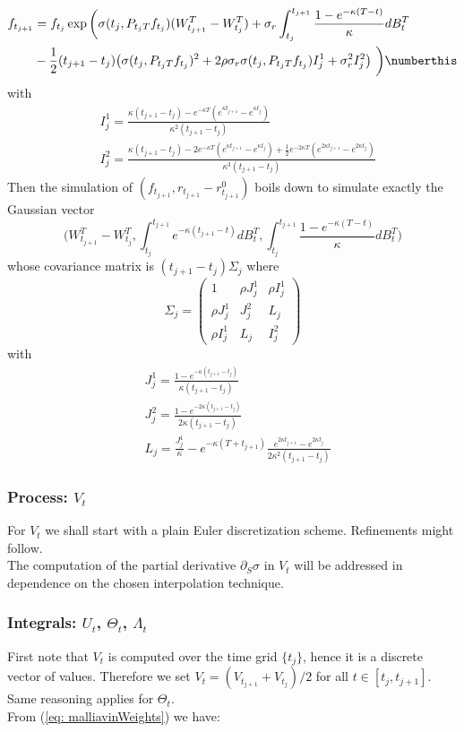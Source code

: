 \begin{align*}
f_{t_{j+1}}& = f_{t_{j}} \exp\bigg(  \sigma(t_j,P_{t_j T}f_{t_j})(W_{t_{j+1}}^T-W^T_{t_{j}})+\sigma_r\int_{t_j}^{t_{j+1}} \frac{1-e^{-\kappa(T-t)}}{\kappa}dB_t^T \\
& -\frac{1}{2}(t_{j+1}-t_{j})\big(\sigma(t_j,P_{t_j T}f_{t_j})^2+2\rho\sigma_r\sigma(t_j,P_{t_j T}f_{t_j})I^1_j + \sigma_r^2I_j^2\big)  \    \bigg) \numberthis \label{eq: discretization_forwardPrice}
\end{align*}
with 
\begin{align*}
& I^1_j = \frac{\kappa(t_{j+1}-t_{j})-e^{-\kappa T }(e^{\kappa t_{j+1} }-e^{\kappa t_{j} }) }{\kappa^2 (t_{j+1}-t_{j})} \\
& I^2_j = \frac{\kappa(t_{j+1}-t_{j})  -2e^{-\kappa T }(e^{\kappa t_{j+1} }-e^{\kappa t_{j} }) +\frac{1}{2}e^{-2\kappa T }(e^{2\kappa t_{j+1} }-e^{2\kappa t_{j} }) }{\kappa^3(t_{j+1}-t_{j})}
\end{align*}
Then the simulation of $(f_{t_{j+1}}, r_{t_{j+1}} - r^0_{t_{j+1}})$ boils down to simulate exactly the Gaussian vector
\[\bigg( W_{t_{j+1}}^T-W^T_{t_{j}},  \int_{t_j}^{t_{j+1}}e^{-\kappa(t_{j+1}-t) }dB_t^T  ,\int_{t_j}^{t_{j+1}} \frac{1-e^{-\kappa(T-t)}}{\kappa}dB_t^T \bigg)  \]
whose covariance matrix is $(t_{j+1}-t_{j})\Sigma_j$ where
\[\Sigma_j= \left( \begin{array}{ccc}
1 & \rho J_j^1 & \rho I_j^1 \\ 
\rho J_j^1 & J_j^2 & L_j \\ 
\rho I_j^1 & L_j & I^2_j \end{array} \right)\] 
with
\begin{align*}
& J_j^1 = \frac{1-e^{-\kappa(t_{j+1}-t_j) }}{\kappa(t_{j+1}-t_j)} \\
& J_j^2 = \frac{1-e^{-2\kappa(t_{j+1}-t_j) } }{2\kappa(t_{j+1}-t_j)} \\
& L_j = \frac{J_j^1}{\kappa}-e^{-\kappa(T + t_{j+1}) } \frac{ e^{2\kappa t_{j+1} }-e^{2\kappa t_{j} }  }{2\kappa^2(t_{j+1}-t_{j})}
\end{align*}
\subsubsection{Process: $V_t$}
For $V_t$ we shall start with a plain Euler discretization scheme. Refinements might follow.\\
The computation of the partial derivative $\partial_S\sigma$ in $V_t$ will be addressed in dependence on the chosen interpolation technique.
\subsubsection{Integrals: $U_t$, $\Theta_t$, $\Lambda_t$}
First note that $V_t$ is computed over the time grid $\{t_j\}$, hence it is a discrete vector of values.
Therefore we set $ V_t = (V_{t_{j+1}}+V_{t_{j}})/2 $ for all $t\in [t_j,t_{j+1}]$. Same reasoning applies for $\Theta_t$.\\
From (\ref{eq: malliavinWeights}) we have: 

